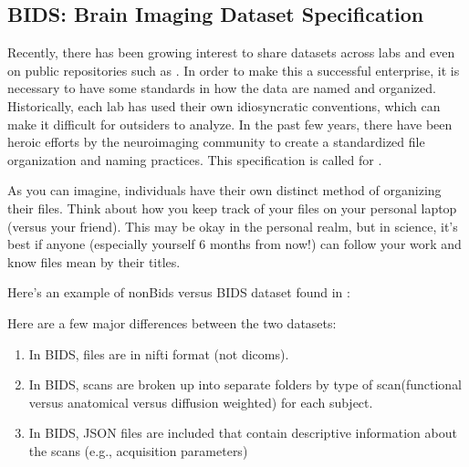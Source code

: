 \documentclass[letterpaper,10pt,english]{sphinxmanual}
\begin{document}
\subsection{BIDS: Brain Imaging Dataset Specification}
\label{\detokenize{content/Introduction_to_Neuroimaging_Data:bids-brain-imaging-dataset-specification}}
Recently, there has been growing interest to share datasets across labs and even on public repositories such as . In order to make this a successful enterprise, it is necessary to have some standards in how the data are named and organized. Historically, each lab has used their own idiosyncratic conventions, which can make it difficult for outsiders to analyze. In the past few years, there have been heroic efforts by the neuroimaging community to create a standardized file organization and naming practices. This specification is called  for .

As you can imagine, individuals have their own distinct method of organizing their files. Think about how you keep track of your files on your personal laptop (versus your friend). This may be okay in the personal realm, but in science, it’s best if anyone (especially  yourself 6 months from now!) can follow your work and know  files mean  by their titles.

Here’s an example of non\sphinxhyphen{}Bids versus BIDS dataset found in :


Here are a few major differences between the two datasets:
\begin{enumerate}
%
\item {} 
In BIDS, files are in nifti format (not dicoms).

\item {} 
In BIDS, scans are broken up into separate folders by type of scan(functional versus anatomical versus diffusion weighted) for each subject.

\item {} 
In BIDS, JSON files are included that contain descriptive information about the scans (e.g., acquisition parameters)

\end{enumerate}
\end{document}
